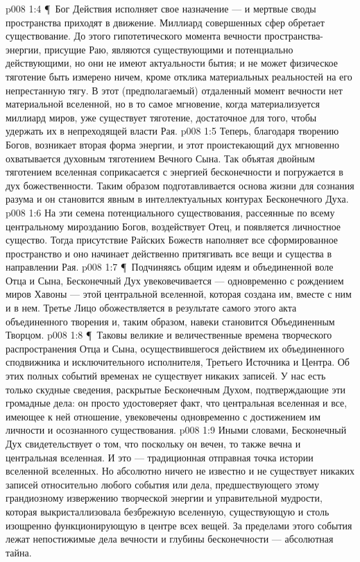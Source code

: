 \vs p008 1:4 \P\ Бог Действия исполняет свое назначение --- и мертвые своды пространства приходят в движение. Миллиард совершенных сфер обретает существование. До этого гипотетического момента вечности пространства\hyp{}энергии, присущие Раю, являются существующими и потенциально действующими, но они не имеют актуальности бытия; и не может физическое тяготение быть измерено ничем, кроме отклика материальных реальностей на его непрестанную тягу. В этот (предполагаемый) отдаленный момент вечности нет материальной вселенной, но в то самое мгновение, когда материализуется миллиард миров, уже существует тяготение, достаточное для того, чтобы удержать их в непреходящей власти Рая.
\vs p008 1:5 Теперь, благодаря творению Богов, возникает вторая форма энергии, и этот проистекающий дух мгновенно охватывается духовным тяготением Вечного Сына. Так объятая двойным тяготением вселенная соприкасается с энергией бесконечности и погружается в дух божественности. Таким образом подготавливается основа жизни для сознания разума и он становится явным в интеллектуальных контурах Бесконечного Духа.
\vs p008 1:6 На эти семена потенциального существования, рассеянные по всему центральному мирозданию Богов, воздействует Отец, и появляется личностное существо. Тогда присутствие Райских Божеств наполняет все сформированное пространство и оно начинает действенно притягивать все вещи и существа в направлении Рая.
\vs p008 1:7 \P\ Подчиняясь общим идеям и объединенной воле Отца и Сына, Бесконечный Дух увековечивается --- одновременно с рождением миров Хавоны --- этой центральной вселенной, которая создана им, вместе с ним и в нем. Третье Лицо обожествляется в результате самого этого акта объединенного творения и, таким образом, навеки становится Объединенным Творцом.
\vs p008 1:8 \P\ Таковы великие и величественные времена творческого распространения Отца и Сына, осуществившегося действием их объединенного сподвижника и исключительного исполнителя, Третьего Источника и Центра. Об этих полных событий временах не существует никаких записей. У нас есть только скудные сведения, раскрытые Бесконечным Духом, подтверждающие эти громадные дела: он просто удостоверяет факт, что центральная вселенная и все, имеющее к ней отношение, увековечены одновременно с достижением им личности и осознанного существования.
\vs p008 1:9 Иными словами, Бесконечный Дух свидетельствует о том, что поскольку он вечен, то также вечна и центральная вселенная. И это --- традиционная отправная точка истории вселенной вселенных. Но абсолютно ничего не известно и не существует никаких записей относительно любого события или дела, предшествующего этому грандиозному извержению творческой энергии и управительной мудрости, которая выкристаллизовала безбрежную вселенную, существующую и столь изощренно функционирующую в центре всех вещей. За пределами этого события лежат непостижимые дела вечности и глубины бесконечности --- абсолютная тайна.
